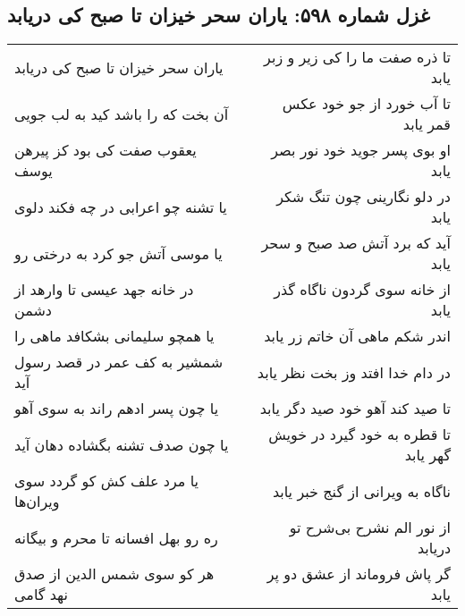 \begin{center}
\section*{غزل شماره ۵۹۸: یاران سحر خیزان تا صبح کی دریابد}
\label{sec:0598}
\begin{longtable}{l p{0.5cm} r}
یاران سحر خیزان تا صبح کی دریابد
&&
تا ذره صفت ما را کی زیر و زبر یابد
\\
آن بخت که را باشد کید به لب جویی
&&
تا آب خورد از جو خود عکس قمر یابد
\\
یعقوب صفت کی بود کز پیرهن یوسف
&&
او بوی پسر جوید خود نور بصر یابد
\\
یا تشنه چو اعرابی در چه فکند دلوی
&&
در دلو نگارینی چون تنگ شکر یابد
\\
یا موسی آتش جو کرد به درختی رو
&&
آید که برد آتش صد صبح و سحر یابد
\\
در خانه جهد عیسی تا وارهد از دشمن
&&
از خانه سوی گردون ناگاه گذر یابد
\\
یا همچو سلیمانی بشکافد ماهی را
&&
اندر شکم ماهی آن خاتم زر یابد
\\
شمشیر به کف عمر در قصد رسول آید
&&
در دام خدا افتد وز بخت نظر یابد
\\
یا چون پسر ادهم راند به سوی آهو
&&
تا صید کند آهو خود صید دگر یابد
\\
یا چون صدف تشنه بگشاده دهان آید
&&
تا قطره به خود گیرد در خویش گهر یابد
\\
یا مرد علف کش کو گردد سوی ویران‌ها
&&
ناگاه به ویرانی از گنج خبر یابد
\\
ره رو بهل افسانه تا محرم و بیگانه
&&
از نور الم نشرح بی‌شرح تو دریابد
\\
هر کو سوی شمس الدین از صدق نهد گامی
&&
گر پاش فروماند از عشق دو پر یابد
\\
\end{longtable}
\end{center}
